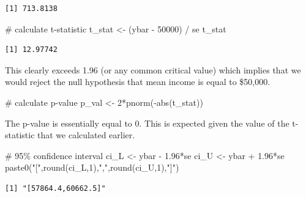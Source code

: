 \documentclass[
  letterpaper,
  DIV=11,
  numbers=noendperiod]{scrreprt}
\newenvironment{Shaded}{\begin{snugshade}}{\end{snugshade}}
\newcommand{\CommentTok}[1]{\textcolor[rgb]{0.37,0.37,0.37}{#1}}
\newcommand{\DecValTok}[1]{\textcolor[rgb]{0.68,0.00,0.00}{#1}}
\newcommand{\FloatTok}[1]{\textcolor[rgb]{0.68,0.00,0.00}{#1}}
\newcommand{\FunctionTok}[1]{\textcolor[rgb]{0.28,0.35,0.67}{#1}}
\newcommand{\NormalTok}[1]{\textcolor[rgb]{0.00,0.23,0.31}{#1}}
\newcommand{\OtherTok}[1]{\textcolor[rgb]{0.00,0.23,0.31}{#1}}
\newcommand{\SpecialCharTok}[1]{\textcolor[rgb]{0.37,0.37,0.37}{#1}}
\newcommand{\StringTok}[1]{\textcolor[rgb]{0.13,0.47,0.30}{#1}}
\begin{document}
\begin{verbatim}
[1] 713.8138
\end{verbatim}

\begin{Shaded}
\begin{Highlighting}[]
\CommentTok{\# calculate t{-}statistic}
\NormalTok{t\_stat }\OtherTok{\textless{}{-}}\NormalTok{ (ybar }\SpecialCharTok{{-}} \DecValTok{50000}\NormalTok{) }\SpecialCharTok{/}\NormalTok{ se}
\NormalTok{t\_stat}
\end{Highlighting}
\end{Shaded}

\begin{verbatim}
[1] 12.97742
\end{verbatim}

This clearly exceeds 1.96 (or any common critical value) which implies
that we would reject the null hypothesis that mean income is equal to
\$50,000.

\begin{Shaded}
\begin{Highlighting}[]
\CommentTok{\# calculate p{-}value}
\NormalTok{p\_val }\OtherTok{\textless{}{-}} \DecValTok{2}\SpecialCharTok{*}\FunctionTok{pnorm}\NormalTok{(}\SpecialCharTok{{-}}\FunctionTok{abs}\NormalTok{(t\_stat))}
\end{Highlighting}
\end{Shaded}

The p-value is essentially equal to 0. This is expected given the value
of the t-statistic that we calculated earlier.

\begin{Shaded}
\begin{Highlighting}[]
\CommentTok{\# 95\% confidence interval}
\NormalTok{ci\_L }\OtherTok{\textless{}{-}}\NormalTok{ ybar }\SpecialCharTok{{-}} \FloatTok{1.96}\SpecialCharTok{*}\NormalTok{se}
\NormalTok{ci\_U }\OtherTok{\textless{}{-}}\NormalTok{ ybar }\SpecialCharTok{+} \FloatTok{1.96}\SpecialCharTok{*}\NormalTok{se}
\FunctionTok{paste0}\NormalTok{(}\StringTok{"["}\NormalTok{,}\FunctionTok{round}\NormalTok{(ci\_L,}\DecValTok{1}\NormalTok{),}\StringTok{","}\NormalTok{,}\FunctionTok{round}\NormalTok{(ci\_U,}\DecValTok{1}\NormalTok{),}\StringTok{"]"}\NormalTok{)}
\end{Highlighting}
\end{Shaded}

\begin{verbatim}
[1] "[57864.4,60662.5]"
\end{verbatim}
\end{document}

